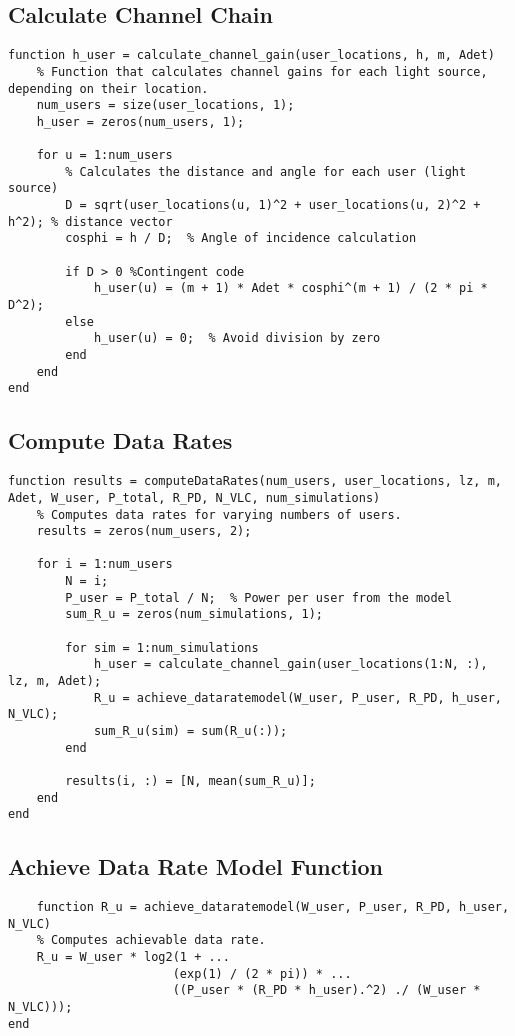 \newpage
\subsection{Calculate Channel Chain}

\begin{lstlisting}
function h_user = calculate_channel_gain(user_locations, h, m, Adet)
    % Function that calculates channel gains for each light source, depending on their location.
    num_users = size(user_locations, 1);
    h_user = zeros(num_users, 1);

    for u = 1:num_users
        % Calculates the distance and angle for each user (light source)
        D = sqrt(user_locations(u, 1)^2 + user_locations(u, 2)^2 + h^2); % distance vector
        cosphi = h / D;  % Angle of incidence calculation
        
        if D > 0 %Contingent code
            h_user(u) = (m + 1) * Adet * cosphi^(m + 1) / (2 * pi * D^2);
        else
            h_user(u) = 0;  % Avoid division by zero
        end
    end
end
\end{lstlisting}\textbf{}

\newpage
\subsection{Compute Data Rates}

\begin{lstlisting}
function results = computeDataRates(num_users, user_locations, lz, m, Adet, W_user, P_total, R_PD, N_VLC, num_simulations)
    % Computes data rates for varying numbers of users.
    results = zeros(num_users, 2);

    for i = 1:num_users
        N = i; 
        P_user = P_total / N;  % Power per user from the model
        sum_R_u = zeros(num_simulations, 1);

        for sim = 1:num_simulations
            h_user = calculate_channel_gain(user_locations(1:N, :), lz, m, Adet);
            R_u = achieve_dataratemodel(W_user, P_user, R_PD, h_user, N_VLC);
            sum_R_u(sim) = sum(R_u(:));
        end

        results(i, :) = [N, mean(sum_R_u)];
    end
end
\end{lstlisting}

\newpage
\subsection{Achieve Data Rate Model Function}

\begin{lstlisting}
    function R_u = achieve_dataratemodel(W_user, P_user, R_PD, h_user, N_VLC)
    % Computes achievable data rate.
    R_u = W_user * log2(1 + ...
                       (exp(1) / (2 * pi)) * ...
                       ((P_user * (R_PD * h_user).^2) ./ (W_user * N_VLC)));
end

\end{lstlisting}\textbf{}
